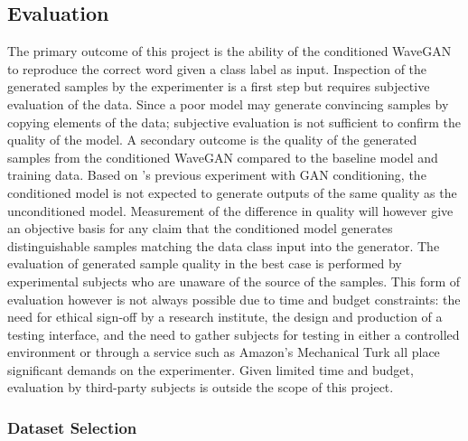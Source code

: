 \documentclass[a4paper, dvipsnames, titlepage]{article}
\begin{document}
\subsection{Evaluation}

The primary outcome of this project is the ability of the conditioned WaveGAN to reproduce the correct word given a class label as input.
Inspection of the generated samples by the experimenter is a first step but requires subjective evaluation of the data.
Since a poor model may generate convincing samples by copying elements of the data; subjective evaluation is not sufficient to confirm the quality of the model.
\newline
\newline
A secondary outcome is the quality of the generated samples from the conditioned WaveGAN compared to the baseline model and training data.
Based on \citeauthor{2014arXiv1411.1784M}'s previous experiment with GAN conditioning, the conditioned model is not expected to generate outputs of the same quality as the unconditioned model.
Measurement of the difference in quality will however give an objective basis for any claim that the conditioned model generates distinguishable samples matching the data class input into the generator.
\newline
\newline
The evaluation of generated sample quality in the best case is performed by experimental subjects who are unaware of the source of the samples.
This form of evaluation however is not always possible due to time and budget constraints: the need for ethical sign-off by a research institute, the design and production of a testing interface, and the need to gather subjects for testing in either a controlled environment or through a service such as Amazon's Mechanical Turk all place significant demands on the experimenter.
Given limited time and budget, evaluation by third-party subjects is outside the scope of this project.

\subsubsection{Dataset Selection}
\end{document}
